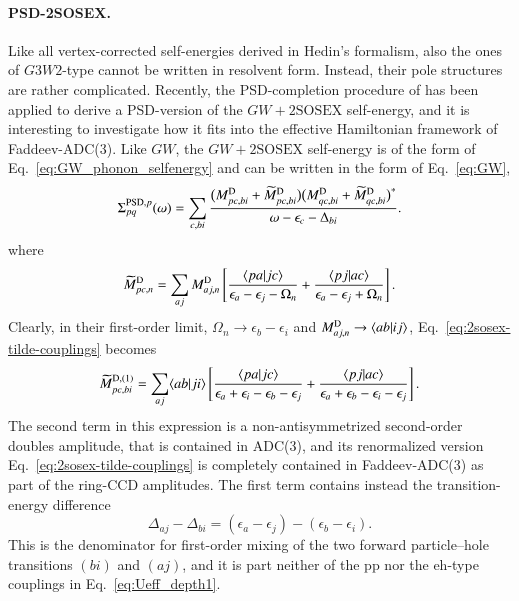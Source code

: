 \documentclass[aip,jcp,reprint,noshowkeys,superscriptaddress]{revtex4-1}
\newcommand{\eps}{\epsilon}
\newcommand{\eh}{\text{eh}}
\newcommand{\pp}{\text{pp}}
\begin{document}
\paragraph{PSD-2SOSEX.}
Like all vertex-corrected self-energies derived in Hedin's formalism,
also the ones of $G3W2$-type cannot be written in resolvent form. Instead, their pole 
structures are rather complicated. Recently, the PSD-completion procedure of 
\citet{stefanucci2014diagrammatic} has been applied to derive a PSD-version of the 
$GW+\text{2SOSEX}$ self-energy,\cite{Bruneval2025} and it is interesting to investigate 
how it fits into the effective Hamiltonian framework of Faddeev-ADC(3). 
Like $GW$, the $GW+\text{2SOSEX}$ self-energy is of the form of 
Eq.~\eqref{eq:GW_phonon_selfenergy} and can be written in 
the form of Eq.~\eqref{eq:GW},
\begin{equation}
	\label{eq:psd-2SOSEX}
    \Sigma_{pq}^{{\rm PSD},p}(\omega)
    =
    \sum_{c,bi}
    \frac{
        \bigl(
            M^{\rm D}_{pc,bi}
            +
            \widetilde M^{\rm D}_{pc,bi}
        \bigr)
        \bigl(
            M^{\rm D}_{qc,bi}
            +
            \widetilde M^{\rm D}_{qc,bi}
        \bigr)^*
    }
    {
        \omega-\eps_c-\Delta_{bi}
    }.
\end{equation}
where
\begin{equation}
    \widetilde{M}^{\rm D}_{pc,n}
    =
    \sum_{aj}
    M^{\rm D}_{aj,n}
    \left[
        \frac{\braket{pa}{jc}}
        {\eps_a-\eps_j-\Omega_n}
        +
        \frac{\braket{pj}{ac}}
        {\eps_a-\eps_j+\Omega_n}
    \right].
    \label{eq:2sosex-tilde-couplings}
\end{equation}
Clearly, in their first-order limit, $\Omega_n \rightarrow \eps_b -\eps_i$ 
and $M^{\rm D}_{aj,n} \rightarrow \braket{ab}{ij}$, 
Eq.~\eqref{eq:2sosex-tilde-couplings} becomes  
\begin{equation}
    \widetilde{M}^{\rm D,(1)}_{pc,bi}
    =
    \sum_{aj}
    \langle ab|ji\rangle
    \left[
        \frac{\langle pa|jc\rangle}
        {\eps_a+\eps_i-\eps_b-\eps_j}
        +
        \frac{\langle pj|ac\rangle}
        {\eps_a+\eps_b-\eps_i-\eps_j}
    \right].
    \label{eq:2sosex-weak-coupling}
\end{equation}
The second term in this expression is a non-antisymmetrized 
second-order doubles amplitude, that is contained in 
ADC(3), and its renormalized version
Eq.~\eqref{eq:2sosex-tilde-couplings} is completely 
contained in Faddeev-ADC(3) as part of the ring-CCD 
amplitudes. The first term contains instead
the transition-energy difference
\begin{equation}
    \Delta_{aj}-\Delta_{bi}
    =
    (\epsilon_a-\epsilon_j)-(\epsilon_b-\epsilon_i).
    \label{eq:forward-ph-denominator}
\end{equation}
This is the
denominator for first-order mixing of the two forward particle--hole
transitions $(bi)$ and $(aj)$, and it is part neither of the $\pp$ nor 
the $\eh$-type couplings in Eq.~\eqref{eq:Ueff_depth1}. 
\end{document}
